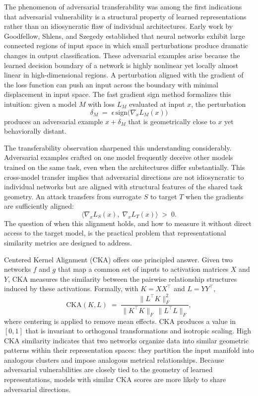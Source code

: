 \documentclass[12pt,a4paper]{article}
\theoremstyle{plain}
\theoremstyle{definition}
\newcommand{\sign}{\mathrm{sign}}
\begin{document}
The phenomenon of adversarial transferability was among the first indications that adversarial vulnerability is a structural property of learned representations rather than an idiosyncratic flaw of individual architectures. Early work by Goodfellow, Shlens, and Szegedy established that neural networks exhibit large connected regions of input space in which small perturbations produce dramatic changes in output classification. These adversarial examples arise because the learned decision boundary of a network is highly nonlinear yet locally almost linear in high-dimensional regions. A perturbation aligned with the gradient of the loss function can push an input across the boundary with minimal displacement in input space. The fast gradient sign method formalizes this intuition: given a model $M$ with loss $L_M$ evaluated at input $x$, the perturbation
\[
\delta_M \;=\; \epsilon\,\sign\!\bigl(\nabla_x L_M(x)\bigr)
\]
produces an adversarial example $x + \delta_M$ that is geometrically close to $x$ yet behaviorally distant.

The transferability observation sharpened this understanding considerably. Adversarial examples crafted on one model frequently deceive other models trained on the same task, even when the architectures differ substantially. This cross-model transfer implies that adversarial directions are not idiosyncratic to individual networks but are aligned with structural features of the shared task geometry. An attack transfers from surrogate $S$ to target $T$ when the gradients are sufficiently aligned:
\[
\bigl\langle \nabla_x L_S(x),\; \nabla_x L_T(x) \bigr\rangle \;>\; 0.
\]
The question of when this alignment holds, and how to measure it without direct access to the target model, is the practical problem that representational similarity metrics are designed to address.

Centered Kernel Alignment (CKA) offers one principled answer. Given two networks $f$ and $g$ that map a common set of inputs to activation matrices $X$ and $Y$, CKA measures the similarity between the pairwise relationship structures induced by these activations. Formally, with $K = XX^\top$ and $L = YY^\top$,
\[
\mathrm{CKA}(K, L) \;=\; \frac{\|L^\top K\|_F^2}{\|K^\top K\|_F \,\|L^\top L\|_F},
\]
where centering is applied to remove mean effects. CKA produces a value in $[0,1]$ that is invariant to orthogonal transformations and isotropic scaling. High CKA similarity indicates that two networks organize data into similar geometric patterns within their representation spaces: they partition the input manifold into analogous clusters and impose analogous metrical relationships. Because adversarial vulnerabilities are closely tied to the geometry of learned representations, models with similar CKA scores are more likely to share adversarial directions.
\end{document}

